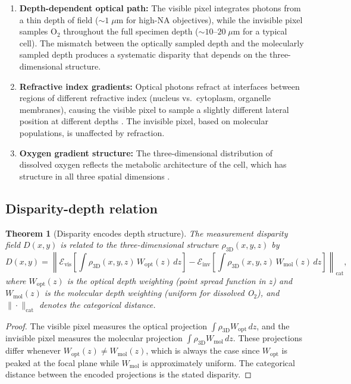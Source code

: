 \documentclass[11pt,twocolumn,a4paper]{article}
\newtheorem{theorem}{Theorem}
\begin{document}
\begin{enumerate}
\item \textbf{Depth-dependent optical path:} The visible pixel integrates photons from a thin depth of field ($\sim 1\;\mu$m for high-NA objectives), while the invisible pixel samples O$_2$ throughout the full specimen depth ($\sim 10$--$20\;\mu$m for a typical cell).
The mismatch between the optically sampled depth and the molecularly sampled depth produces a systematic disparity that depends on the three-dimensional structure.

\item \textbf{Refractive index gradients:} Optical photons refract at interfaces between regions of different refractive index (nucleus vs.\ cytoplasm, organelle membranes), causing the visible pixel to sample a slightly different lateral position at different depths \citep{Mertz2019}.
The invisible pixel, based on molecular populations, is unaffected by refraction.

\item \textbf{Oxygen gradient structure:} The three-dimensional distribution of dissolved oxygen reflects the metabolic architecture of the cell, which has structure in all three spatial dimensions \citep{Carreau2011}.
\end{enumerate}

\subsection{Disparity-depth relation}

\begin{theorem}[Disparity encodes depth structure]\label{thm:depth}
The measurement disparity field $D(x,y)$ is related to the three-dimensional structure $\rho_{\mathrm{3D}}(x,y,z)$ by
\begin{equation}\label{eq:depth}
D(x,y) = \left\| \mathcal{E}_{\mathrm{vis}}\!\left[\int \rho_{\mathrm{3D}}(x,y,z)\, W_{\mathrm{opt}}(z)\, dz\right] - \mathcal{E}_{\mathrm{inv}}\!\left[\int \rho_{\mathrm{3D}}(x,y,z)\, W_{\mathrm{mol}}(z)\, dz\right] \right\|_{\mathrm{cat}},
\end{equation}
where $W_{\mathrm{opt}}(z)$ is the optical depth weighting (point spread function in $z$) and $W_{\mathrm{mol}}(z)$ is the molecular depth weighting (uniform for dissolved O$_2$), and $\|\cdot\|_{\mathrm{cat}}$ denotes the categorical distance.
\end{theorem}
\begin{proof}
The visible pixel measures the optical projection $\int \rho_{\mathrm{3D}} W_{\mathrm{opt}} \, dz$, and the invisible pixel measures the molecular projection $\int \rho_{\mathrm{3D}} W_{\mathrm{mol}} \, dz$.
These projections differ whenever $W_{\mathrm{opt}}(z) \neq W_{\mathrm{mol}}(z)$, which is always the case since $W_{\mathrm{opt}}$ is peaked at the focal plane while $W_{\mathrm{mol}}$ is approximately uniform.
The categorical distance between the encoded projections is the stated disparity.
\end{proof}
\end{document}
